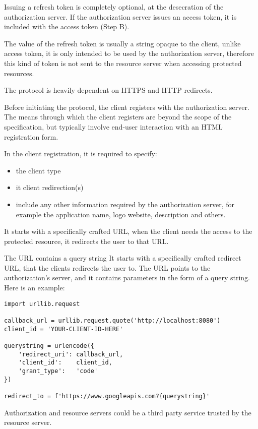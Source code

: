 Issuing a refresh token is completely optional, at the desecration of the
authorization server.
If the authorization server issues an access token, it is included with the
access token (Step B).

The value of the refresh token is usually a string opaque to the client, unlike
access token, it is only intended to be used by the authorization server,
therefore this kind of token is not sent to the resource server when accessing
protected resources.


The protocol is heavily dependent on HTTPS and HTTP redirects.

Before initiating the protocol, the client registers with the authorization
server.
The means through which the client registers are beyond the scope of the
specification, but typically involve end-user interaction with an HTML
registration form.

In the client registration, it is required to specify:
\begin{itemize}
    \item the client type
    \item it client redirection(s)
    \item include any other information required by the authorization server,
        for example the application name, logo website, description and others.
\end{itemize}

It starts with a specifically crafted URL, when the client needs the access to
the protected resource, it redirects the user to that URL.

The URL contains a query string
It starts with a specifically crafted redirect URL, that the clients
redirects the user to.
The URL points to the authorization's server, and it contains parameters in the
form of a query string. Here is an example:

\begin{lstlisting}
import urllib.request

callback_url = urllib.request.quote('http://localhost:8080')
client_id = 'YOUR-CLIENT-ID-HERE'

querystring = urlencode({
    'redirect_uri': callback_url,
    'client_id':    client_id,
    'grant_type':   'code'
})

redirect_to = f'https://www.googleapis.com?{querystring}'
\end{lstlisting}


Authorization and resource servers could be a third party service trusted by the
resource server.

